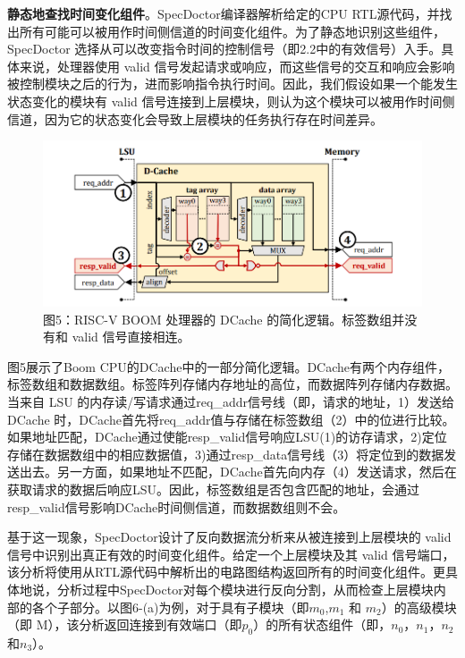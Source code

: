 \textbf{静态地查找时间变化组件}。SpecDoctor编译器解析给定的CPU RTL源代码，并找出所有可能可以被用作时间侧信道的时间变化组件。为了静态地识别这些组件，SpecDoctor 选择从可以改变指令时间的控制信号（即2.2中的有效信号）入手。具体来说，处理器使用 valid 信号发起请求或响应，而这些信号的交互和响应会影响被控制模块之后的行为，进而影响指令执行时间。因此，我们假设如果一个能发生状态变化的模块有 valid 信号连接到上层模块，则认为这个模块可以被用作时间侧信道，因为它的状态变化会导致上层模块的任务执行存在时间差异。\par

\begin{figure}[!h]
    \centering
    \includegraphics[width=\linewidth]{figure/proposal/specdoctor-figure5.png}
    \caption*{图5：RISC-V BOOM 处理器的 DCache 的简化逻辑。标签数组并没有和 valid 信号直接相连。}
\end{figure}

图5展示了Boom CPU的DCache中的一部分简化逻辑。DCache有两个内存组件，标签数组和数据数组。标签阵列存储内存地址的高位，而数据阵列存储内存数据。当来自 LSU 的内存读/写请求通过req\_addr信号线（即，请求的地址，1）发送给 DCache 时，DCache首先将req\_addr值与存储在标签数组（2）中的位进行比较。如果地址匹配，DCache通过使能resp\_valid信号响应LSU(1)的访存请求，2)定位存储在数据数组中的相应数据值，3)通过resp\_data信号线（3）将定位到的数据发送出去。另一方面，如果地址不匹配，DCache首先向内存（4）发送请求，然后在获取请求的数据后响应LSU。因此，标签数组是否包含匹配的地址，会通过resp\_valid信号影响DCache时间侧信道，而数据数组则不会。\par

基于这一现象，SpecDoctor设计了反向数据流分析来从被连接到上层模块的 valid 信号中识别出真正有效的时间变化组件。给定一个上层模块及其 valid 信号端口，该分析将使用从RTL源代码中解析出的电路图结构返回所有的时间变化组件。更具体地说，分析过程中SpecDoctor对每个模块进行反向分割，从而检查上层模块内部的各个子部分。以图6-(a)为例，对于具有子模块（即$m_0$,$m_1$ 和 $m_2$）的高级模块（即 M），该分析返回连接到有效端口（即$p_0$）的所有状态组件（即，$n_0$，$n_1$，$n_2$和$n_3$）。\par

